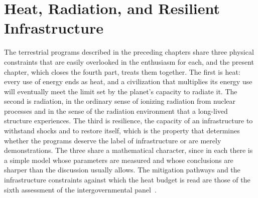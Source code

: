 \chapter{Heat, Radiation, and Resilient Infrastructure}
\label{ch:22}

The terrestrial programs described in the preceding chapters share three physical constraints that are easily overlooked in the enthusiasm for each, and the present chapter, which closes the fourth part, treats them together. The first is heat: every use of energy ends as heat, and a civilization that multiplies its energy use will eventually meet the limit set by the planet's capacity to radiate it. The second is radiation, in the ordinary sense of ionizing radiation from nuclear processes and in the sense of the radiation environment that a long-lived structure experiences. The third is resilience, the capacity of an infrastructure to withstand shocks and to restore itself, which is the property that determines whether the programs deserve the label of infrastructure or are merely demonstrations. The three share a mathematical character, since in each there is a simple model whose parameters are measured and whose conclusions are sharper than the discussion usually allows. The mitigation pathways and the infrastructure constraints against which the heat budget is read are those of the sixth assessment of the intergovernmental panel~\cite{ipccwg3}.

